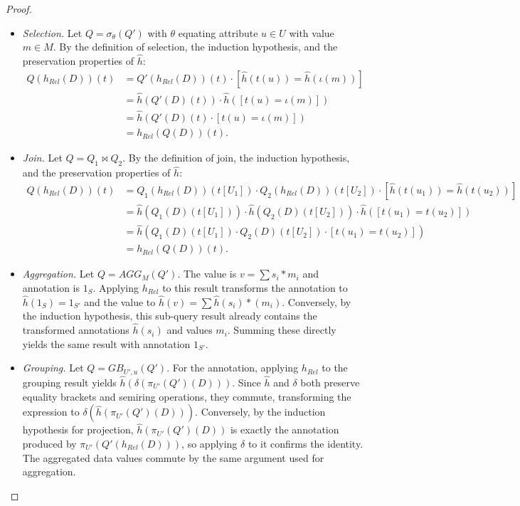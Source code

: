 \documentclass[oneside, 11pt]{amsbook}
\theoremstyle{plain}
\theoremstyle{definition}
\theoremstyle{remark}
\begin{document}
\begin{proof}
\begin{itemize}
        \item \emph{Selection.} Let $Q = \sigma_\theta(Q')$ with $\theta$ equating attribute $u \in U$ with value $m \in M$. By the definition of selection, the induction hypothesis, and the preservation properties of $\widehat{h}$:
              \begin{align*}
                  Q(h_{Rel}(D))(t) & = Q'(h_{Rel}(D))(t) \cdot [\widehat{h}(t(u)) = \widehat{h}(\iota(m))] \\
                                   & = \widehat{h}(Q'(D)(t)) \cdot \widehat{h}([t(u) = \iota(m)])          \\
                                   & = \widehat{h}(Q'(D)(t) \cdot [t(u) = \iota(m)])                       \\
                                   & = h_{Rel}(Q(D))(t).
              \end{align*}

        \item \emph{Join.} Let $Q = Q_1 \bowtie Q_2$. By the definition of join, the induction hypothesis, and the preservation properties of $\widehat{h}$:
              \begin{align*}
                  Q(h_{Rel}(D))(t) & = Q_1(h_{Rel}(D))(t[U_1]) \cdot Q_2(h_{Rel}(D))(t[U_2]) \cdot [\widehat{h}(t(u_1)) = \widehat{h}(t(u_2))] \\
                                   & = \widehat{h}(Q_1(D)(t[U_1])) \cdot \widehat{h}(Q_2(D)(t[U_2])) \cdot \widehat{h}([t(u_1) = t(u_2)])      \\
                                   & = \widehat{h}(Q_1(D)(t[U_1]) \cdot Q_2(D)(t[U_2]) \cdot [t(u_1) = t(u_2)])                                \\
                                   & = h_{Rel}(Q(D))(t).
              \end{align*}

        \item \emph{Aggregation.} Let $Q = AGG_M(Q')$. The value is $v = \sum s_i \ast m_i$ and annotation is $1_S$. Applying $h_{Rel}$ to this result transforms the annotation to $\widehat{h}(1_S) = 1_{S'}$ and the value to $\widehat{h}(v) = \sum \widehat{h}(s_i) \ast (m_i)$. Conversely, by the induction hypothesis, this sub-query result already contains the transformed annotations $\widehat{h}(s_i)$ and values $m_i$. Summing these directly yields the same result with annotation $1_{S'}$.

        \item \emph{Grouping.} Let $Q = GB_{U', u}(Q')$. For the annotation, applying $h_{Rel}$ to the grouping result yields $\widehat{h}(\delta(\pi_{U'}(Q')(D)))$. Since $\widehat{h}$ and $\delta$ both preserve equality brackets and semiring operations, they commute, transforming the expression to $\delta(\widehat{h}(\pi_{U'}(Q')(D)))$. Conversely, by the induction hypothesis for projection, $\widehat{h}(\pi_{U'}(Q')(D))$ is exactly the annotation produced by $\pi_{U'}(Q'(h_{Rel}(D)))$, so applying $\delta$ to it confirms the identity. The aggregated data values commute by the same argument used for aggregation.
    \end{itemize}
\end{proof}
\end{document}
